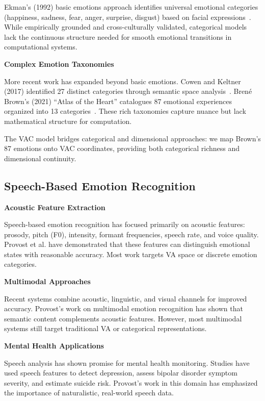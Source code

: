 \documentclass[10pt,twocolumn]{article}
\begin{document}
Ekman's (1992) basic emotions approach identifies universal emotional categories (happiness, sadness, fear, anger, surprise, disgust) based on facial expressions~\cite{ekman1992}. While empirically grounded and cross-culturally validated, categorical models lack the continuous structure needed for smooth emotional transitions in computational systems.

\textbf{Complex Emotion Taxonomies}

More recent work has expanded beyond basic emotions. Cowen and Keltner (2017) identified 27 distinct categories through semantic space analysis~\cite{cowen2017}. Brené Brown's (2021) ``Atlas of the Heart'' catalogues 87 emotional experiences organized into 13 categories~\cite{brown2021}. These rich taxonomies capture nuance but lack mathematical structure for computation.

The VAC model bridges categorical and dimensional approaches: we map Brown's 87 emotions onto VAC coordinates, providing both categorical richness and dimensional continuity.

\subsection{Speech-Based Emotion Recognition}

\textbf{Acoustic Feature Extraction}

Speech-based emotion recognition has focused primarily on acoustic features: prosody, pitch (F0), intensity, formant frequencies, speech rate, and voice quality. Provost et al. have demonstrated that these features can distinguish emotional states with reasonable accuracy. Most work targets VA space or discrete emotion categories.

\textbf{Multimodal Approaches}

Recent systems combine acoustic, linguistic, and visual channels for improved accuracy. Provost's work on multimodal emotion recognition has shown that semantic content complements acoustic features. However, most multimodal systems still target traditional VA or categorical representations.

\textbf{Mental Health Applications}

Speech analysis has shown promise for mental health monitoring. Studies have used speech features to detect depression, assess bipolar disorder symptom severity, and estimate suicide risk. Provost's work in this domain has emphasized the importance of naturalistic, real-world speech data.
\end{document}
